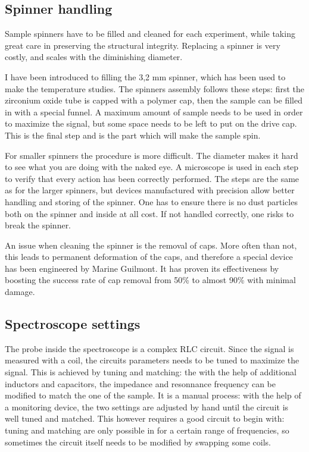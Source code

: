 \documentclass[12pt]{article}
\begin{document}
\subsection{Spinner handling}

Sample spinners have to be filled and cleaned for each experiment, while taking great care in preserving the structural integrity. Replacing a spinner is very costly, and scales with the diminishing diameter.

I have been introduced to filling the 3,2 mm spinner, which has been used to make the temperature studies. The spinners assembly follows these steps: first the zirconium oxide tube is capped with a polymer cap, then the sample can be filled in with a special funnel. A maximum amount of sample needs to be used in order to maximize the signal, but some space needs to be left to put on the drive cap. This is the final step and is the part which will make the sample spin.

For smaller spinners the procedure is more difficult. The diameter makes it hard to see what you are doing with the naked eye. A microscope is used in each step to verify that every action has been correctly performed. The steps are the same as for the larger spinners, but devices manufactured with precision allow better handling and storing of the spinner. One has to ensure there is no dust particles both on the spinner and inside at all cost. If not handled correctly, one risks to break the spinner.

An issue when cleaning the spinner is the removal of caps. More often than not, this leads to permanent deformation of the caps, and therefore a special device has been engineered by Marine Guilmont. It has proven its effectiveness by boosting the success rate of cap removal from 50\% to almost 90\% with minimal damage.

\subsection{Spectroscope settings}

The probe inside the spectroscope is a complex RLC circuit. Since the signal is measured with a coil, the circuits parameters needs to be tuned to maximize the signal. This is achieved by tuning and matching: the with the help of additional inductors and capacitors, the impedance and resonnance frequency can be modified to match the one of the sample. It is a manual process: with the help of a monitoring device, the two settings are adjusted by hand until the circuit is well tuned and matched. This however requires a good circuit to begin with: tuning and matching are only possible in for a certain range of frequencies, so sometimes the circuit itself needs to be modified by swapping some coils.
\end{document}
